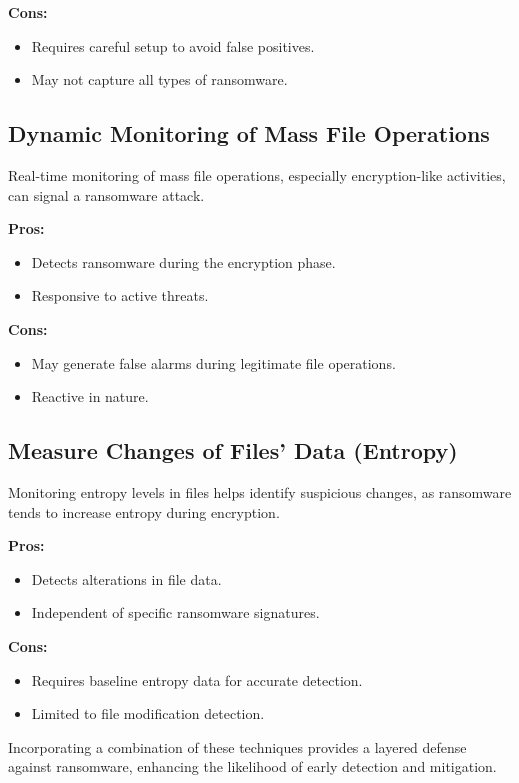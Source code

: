 \documentclass[12pt,twocolumn]{article}
\begin{document}
\textbf{Cons:}
\begin{itemize}
  \item Requires careful setup to avoid false positives.
  \item May not capture all types of ransomware.
\end{itemize}

\subsection{Dynamic Monitoring of Mass File Operations}

Real-time monitoring of mass file operations, especially encryption-like activities, can signal a ransomware attack.

\textbf{Pros:}
\begin{itemize}
  \item Detects ransomware during the encryption phase.
  \item Responsive to active threats.
\end{itemize}

\textbf{Cons:}
\begin{itemize}
  \item May generate false alarms during legitimate file operations.
  \item Reactive in nature.
\end{itemize}

\subsection{Measure Changes of Files’ Data (Entropy)}

Monitoring entropy levels in files helps identify suspicious changes, as ransomware tends to increase entropy during encryption.

\textbf{Pros:}
\begin{itemize}
  \item Detects alterations in file data.
  \item Independent of specific ransomware signatures.
\end{itemize}

\textbf{Cons:}
\begin{itemize}
  \item Requires baseline entropy data for accurate detection.
  \item Limited to file modification detection.
\end{itemize}

Incorporating a combination of these techniques provides a layered defense against ransomware, enhancing the likelihood of early detection and mitigation.
\end{document}
